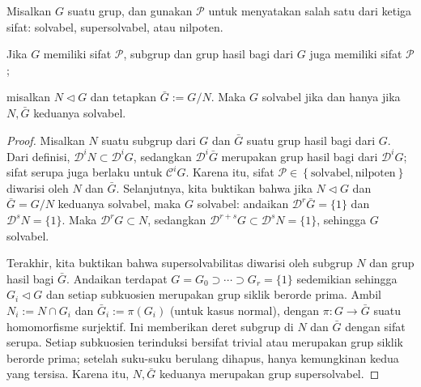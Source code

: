 \begin{lemma}\label{prop:solvable-ses}
	Misalkan $G$ suatu grup, dan gunakan $\mathcal{P}$ untuk menyatakan salah satu dari ketiga sifat: solvabel, supersolvabel, atau nilpoten.
	\begin{compactitem}
		\item Jika $G$ memiliki sifat $\mathcal{P}$, subgrup dan grup hasil bagi dari $G$ juga memiliki sifat $\mathcal{P}$;
		\item misalkan $N \lhd G$ dan tetapkan $\bar{G} := G/N$. Maka $G$ solvabel jika dan hanya jika $N, \bar{G}$ keduanya solvabel.
	\end{compactitem}
\end{lemma}
\begin{proof}
	Misalkan $N$ suatu subgrup dari $G$ dan $\bar{G}$ suatu grup hasil bagi dari $G$. Dari definisi, $\mathscr{D}^i N \subset \mathscr{D}^i G$, sedangkan $\mathscr{D}^i \bar{G}$ merupakan grup hasil bagi dari $\mathscr{D}^i G$; sifat serupa juga berlaku untuk $\mathscr{C}^i G$. Karena itu, sifat $\mathcal{P} \in \left\{\text{solvabel}, \text{nilpoten}\right\}$ diwarisi oleh $N$ dan $\bar{G}$. Selanjutnya, kita buktikan bahwa jika $N \lhd G$ dan $\bar{G} = G/N$ keduanya solvabel, maka $G$ solvabel: andaikan $\mathscr{D}^r \bar{G} = \{1\}$ dan $\mathscr{D}^s N = \{1\}$. Maka $\mathscr{D}^r G \subset N$, sedangkan $\mathscr{D}^{r+s} G \subset \mathscr{D}^s N = \{1\}$, sehingga $G$ solvabel.

	Terakhir, kita buktikan bahwa supersolvabilitas diwarisi oleh subgrup $N$ dan grup hasil bagi $\bar{G}$. Andaikan terdapat $G = G_0 \supset \cdots \supset G_r = \{1\}$ sedemikian sehingga $G_i \lhd G$ dan setiap subkuosien merupakan grup siklik berorde prima. Ambil $N_i := N \cap G_i$ dan $\bar{G}_i := \pi(G_i)$ (untuk kasus normal), dengan $\pi: G \to \bar{G}$ suatu homomorfisme surjektif. Ini memberikan deret subgrup di $N$ dan $\bar{G}$ dengan sifat serupa. Setiap subkuosien terinduksi bersifat trivial atau merupakan grup siklik berorde prima; setelah suku-suku berulang dihapus, hanya kemungkinan kedua yang tersisa. Karena itu, $N, \bar{G}$ keduanya merupakan grup supersolvabel.
\end{proof}

